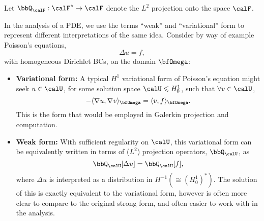     \shortline

    Let $\bbQ_{\calF} : \calF^{*} \rightarrow \calF$ denote the $L^{2}$ projection onto the space $\calF$.

    In the analysis of a PDE, we use the terms ``weak'' and ``variational'' form to represent different interpretations of the same idea. Consider by way of example Poisson's equations,
    \begin{equation}
        \Delta u  =  f,
    \end{equation}
    with homogeneous Dirichlet BCs, on the domain $\bfOmega$:
    \begin{itemize}
        \item  {\bf Variational form:} A typical $H^{1}$ variational form of Poisson's equation might seek $u \in \calU$, for some solution space $\calU \leqslant H^{1}_{0}$, such that $\forall v \in \calU$,
        \begin{equation}
            - \langle\nabla u, \nabla v\rangle_{\bfOmega}  =  \langle v, f\rangle_{\bfOmega}.
        \end{equation}
        This is the form that would be employed in Galerkin projection and computation.
        \item  {\bf Weak form:} With sufficient regularity on $\calU$, this variational form can be equivalently written in terms of ($L^{2}$) projection operators, $\bbQ_{\calU}$, as
        \begin{equation}
            \bbQ_{\calU}[\Delta u]  =  \bbQ_{\calU}[f],
        \end{equation}
        where $\Delta u$ is interpreted as a distribution in $H^{- 1} (\cong (H^{1}_{0})^{*})$. The solution of this is exactly equivalent to the variational form, however is often more clear to compare to the original strong form, and often easier to work with in the analysis.
    \end{itemize}
    
